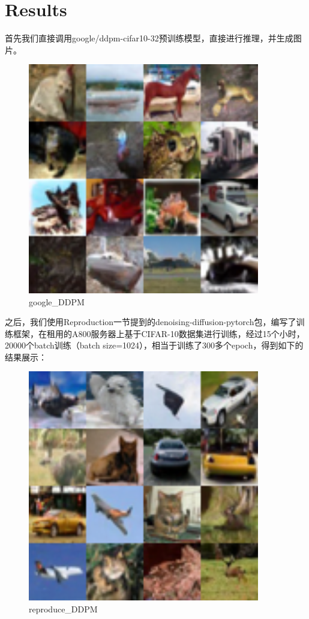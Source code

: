 \documentclass{ctexart}
\begin{document}
\section{Results}
\noindent
首先我们直接调用google/ddpm-cifar10-32预训练模型，直接进行推理，并生成图片。
\begin{figure}[htb]
    \centering
    \includegraphics[width=0.9\textwidth]{ddpm_cifar10_grid1.png}
    \caption{google_DDPM}
    \label{fig:cifar10_grid}
\end{figure}

\noindent
之后，我们使用Reproduction一节提到的denoising-diffusion-pytorch包，编写了训练框架，在租用的A800服务器上基于CIFAR-10数据集进行训练，经过15个小时，20000个batch训练（batch size=1024），相当于训练了300多个epoch，得到如下的结果展示：
\begin{figure}[htb]
    \centering
    \includegraphics[width=0.9\textwidth]{ddpm_cifar10_grid.png}
    \caption{reproduce_DDPM}
    \label{fig:cifar10_grid}
\end{figure}
\end{document}
